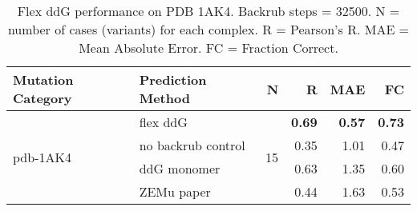 \begin{table}
  \begin{tabular}{llrrrr}
\toprule
Mutation Category &   Prediction Method &   N &    R &  MAE &   FC \\
\midrule
 \multirow{ 4}{*}{pdb-1AK4} & flex ddG & \multirow{ 4}{*}{15} & \textbf{0.69} & \textbf{0.57} & \textbf{0.73}  \\
 & no backrub control & & 0.35 & 1.01 & 0.47  \\
 & ddG monomer & & 0.63 & 1.35 & 0.60  \\
 & ZEMu paper & & 0.44 & 1.63 & 0.53  \\
\bottomrule
\end{tabular}
  \caption[Flex ddG performance on PDB 1AK4]{
    Flex ddG performance on PDB 1AK4. Backrub steps = 32500. N = number of cases (variants) for each complex. R = Pearson's R. MAE = Mean Absolute Error. FC = Fraction Correct.
  } \label{tab:table-pdb-1AK4}
\end{table}
